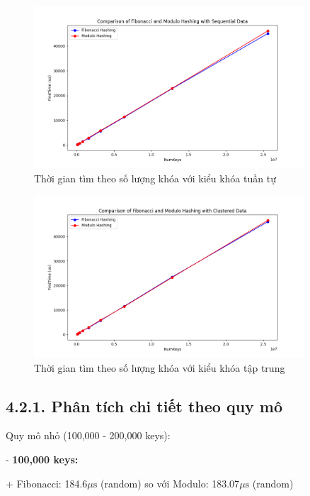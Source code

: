 \documentclass[12pt,a4paper]{report}
\begin{document}
\begin{figure}[!ht]
    \centering
    \includegraphics[width=0.9\textwidth]{find_seq.png}
    \caption{Thời gian tìm theo số lượng khóa với kiểu khóa tuần tự}
    \label{fig:find_seq}
\end{figure}

\begin{figure}[!ht]
    \centering
    \includegraphics[width=0.9\textwidth]{find_clus.png}
    \caption{Thời gian tìm theo số lượng khóa với kiểu khóa tập trung}
    \label{fig:find_clus}
\end{figure}

\subsection*{4.2.1. Phân tích chi tiết theo quy mô}
\noindent \indent Quy mô nhỏ (100,000 - 200,000 keys):

    - \textbf{100,000 keys:}
    
       \hspace{1cm}+ Fibonacci: 184.6$\mu\text{s}$ (random) so với Modulo: 183.07$\mu\text{s}$ (random)
        
\end{document}

